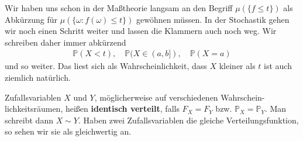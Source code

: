 Wir haben uns schon in der Ma\ss theorie langsam an den Begriff $\mu(\{f\leq t\})$ als Abk\"urzung f\"ur $\mu(\{\omega: f(\omega)\leq t\})$ gew\"ohnen m\"ussen. In der Stochastik gehen wir noch einen Schritt weiter und lassen die Klammern auch noch weg. Wir schreiben daher immer abk\"urzend
\begin{align*}
	\mathbb P(X< t),\quad \mathbb P(X\in (a,b]),\quad \mathbb P(X=a)
\end{align*}
und so weiter. Das liest sich als \glqq Wahrscheinlichkeit, dass $X$ kleiner als $t$ ist\grqq{} auch ziemlich nat\"urlich.



\begin{deff}
	Zufallsvariablen $X$ und $Y$, m\"oglicherweise auf verschiedenen Wahrschein-lichkeitsr\"aumen, heißen \textbf{identisch verteilt}, falls $F_X = F_Y$ bzw. $\mathbb P_X=\mathbb P_Y$. Man schreibt dann $X\sim Y$. Haben zwei Zufallsvariablen die gleiche Verteilungsfunktion, so sehen wir sie als gleichwertig an.
\end{deff}

